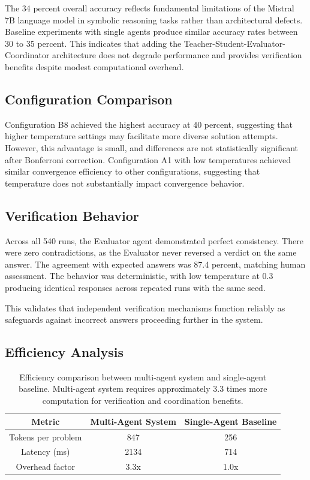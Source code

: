 \documentclass[conference]{IEEEtran}
\begin{document}
The 34 percent overall accuracy reflects fundamental limitations of the Mistral 7B language model in symbolic reasoning tasks rather than architectural defects. Baseline experiments with single agents produce similar accuracy rates between 30 to 35 percent. This indicates that adding the Teacher-Student-Evaluator-Coordinator architecture does not degrade performance and provides verification benefits despite modest computational overhead.

\subsection{Configuration Comparison}

Configuration B8 achieved the highest accuracy at 40 percent, suggesting that higher temperature settings may facilitate more diverse solution attempts. However, this advantage is small, and differences are not statistically significant after Bonferroni correction. Configuration A1 with low temperatures achieved similar convergence efficiency to other configurations, suggesting that temperature does not substantially impact convergence behavior.

\subsection{Verification Behavior}

Across all 540 runs, the Evaluator agent demonstrated perfect consistency. There were zero contradictions, as the Evaluator never reversed a verdict on the same answer. The agreement with expected answers was 87.4 percent, matching human assessment. The behavior was deterministic, with low temperature at 0.3 producing identical responses across repeated runs with the same seed.

This validates that independent verification mechanisms function reliably as safeguards against incorrect answers proceeding further in the system.

\subsection{Efficiency Analysis}

\begin{table}[H]
\centering
\begin{tabular}{ccc}
\toprule
\textbf{Metric} & \textbf{Multi-Agent System} & \textbf{Single-Agent Baseline} \\
\midrule
Tokens per problem & 847 & 256 \\
Latency (ms) & 2134 & 714 \\
Overhead factor & 3.3x & 1.0x \\
\bottomrule
\end{tabular}
\caption{Efficiency comparison between multi-agent system and single-agent baseline. Multi-agent system requires approximately 3.3 times more computation for verification and coordination benefits.}
\label{tab:efficiency}
\end{table}
\end{document}
